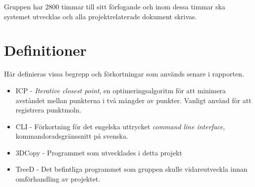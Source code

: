 Gruppen har 2800 timmar till sitt förfogande och inom dessa timmar ska systemet utvecklas och alla projektrelaterade dokument skrivas.

\section{Definitioner}
\label{sec:definitions}
Här definieras vissa begrepp och förkortningar som används senare i rapporten.

\begin{itemize}
	\item ICP - \textit{Iterative closest point}, en optimeringsalgoritm för att minimera avståndet mellan punkterna i två mängder av punkter. Vanligt använd för att registrera punktmoln.
	\item CLI - Förkortning för det engelska uttrycket \textit{command line interface}, kommandoradsgränssnitt på svenska.
	\item 3DCopy - Programmet som utvecklades i detta projekt
	\item TreeD - Det befintliga programmet som gruppen skulle vidareutveckla innan omförhandling av projektet.
\end{itemize} 


